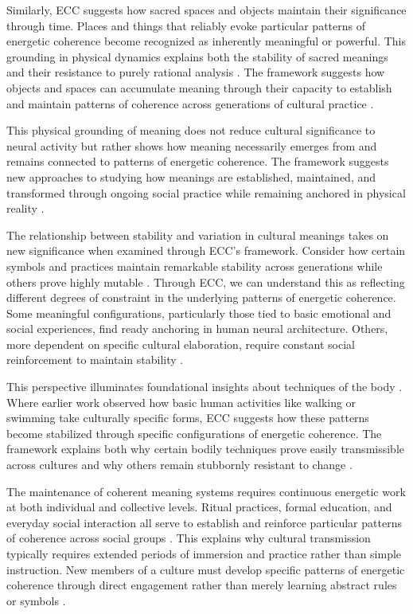 \begin{refsection}
Similarly, ECC suggests how sacred spaces and objects maintain their significance through time. Places and things that reliably evoke particular patterns of energetic coherence become recognized as inherently meaningful or powerful. This grounding in physical dynamics explains both the stability of sacred meanings and their resistance to purely rational analysis \cite{eliade1959sacred}. The framework suggests how objects and spaces can accumulate meaning through their capacity to establish and maintain patterns of coherence across generations of cultural practice \cite{keane2003semiotics}.

This physical grounding of meaning does not reduce cultural significance to neural activity but rather shows how meaning necessarily emerges from and remains connected to patterns of energetic coherence. The framework suggests new approaches to studying how meanings are established, maintained, and transformed through ongoing social practice while remaining anchored in physical reality \cite{csordas1990embodiment}.

The relationship between stability and variation in cultural meanings takes on new significance when examined through ECC's framework. Consider how certain symbols and practices maintain remarkable stability across generations while others prove highly mutable \cite{sperber1996explaining}. Through ECC, we can understand this as reflecting different degrees of constraint in the underlying patterns of energetic coherence. Some meaningful configurations, particularly those tied to basic emotional and social experiences, find ready anchoring in human neural architecture. Others, more dependent on specific cultural elaboration, require constant social reinforcement to maintain stability \cite{boyer1994naturalness}.

This perspective illuminates foundational insights about techniques of the body \cite{bourdieu1990logic}. Where earlier work observed how basic human activities like walking or swimming take culturally specific forms, ECC suggests how these patterns become stabilized through specific configurations of energetic coherence. The framework explains both why certain bodily techniques prove easily transmissible across cultures and why others remain stubbornly resistant to change \cite{ingold2000perception}.

The maintenance of coherent meaning systems requires continuous energetic work at both individual and collective levels. Ritual practices, formal education, and everyday social interaction all serve to establish and reinforce particular patterns of coherence across social groups \cite{hutchins1995cognition}. This explains why cultural transmission typically requires extended periods of immersion and practice rather than simple instruction. New members of a culture must develop specific patterns of energetic coherence through direct engagement rather than merely learning abstract rules or symbols \cite{tomasello1999cultural}.


\end{refsection}

